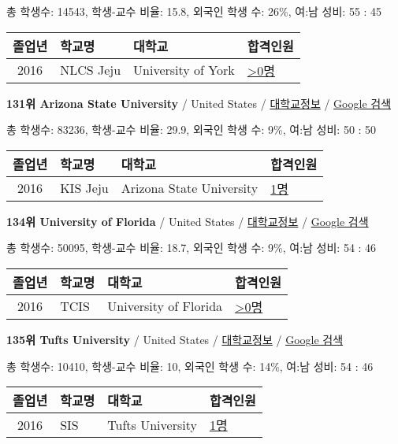 \documentclass[13pt,]{article}
\begin{document}
총 학생수: 14543, 학생-교수 비율: 15.8, 외국인 학생 수: 26\%, 여:남
성비: 55 : 45

\begin{longtable}[]{@{}clll@{}}
\toprule
졸업년 & 학교명 & 대학교 & 합격인원\tabularnewline
\midrule
\endhead
2016 & NLCS Jeju & University of York &
\href{http://cafe.naver.com/assarabia/11592}{\textgreater{}0명}\tabularnewline
\bottomrule
\end{longtable}

\textbf{131위 Arizona State University} / United States /
\href{https://www.timeshighereducation.com/world-university-rankings/arizona-state-university?ranking-dataset=589595}{대학교정보}
/ \href{http://www.google.com/search?q=Arizona+State+University}{Google
검색}

총 학생수: 83236, 학생-교수 비율: 29.9, 외국인 학생 수: 9\%, 여:남 성비:
50 : 50

\begin{longtable}[]{@{}clll@{}}
\toprule
졸업년 & 학교명 & 대학교 & 합격인원\tabularnewline
\midrule
\endhead
2016 & KIS Jeju & Arizona State University &
\href{http://cafe.naver.com/assarabia/11596}{1명}\tabularnewline
\bottomrule
\end{longtable}

\textbf{134위 University of Florida} / United States /
\href{https://www.timeshighereducation.com/world-university-rankings/university-of-florida?ranking-dataset=589595}{대학교정보}
/ \href{http://www.google.com/search?q=University+of+Florida}{Google
검색}

총 학생수: 50095, 학생-교수 비율: 18.7, 외국인 학생 수: 9\%, 여:남 성비:
54 : 46

\begin{longtable}[]{@{}clll@{}}
\toprule
졸업년 & 학교명 & 대학교 & 합격인원\tabularnewline
\midrule
\endhead
2016 & TCIS & University of Florida &
\href{http://cafe.naver.com/assarabia/11598}{\textgreater{}0명}\tabularnewline
\bottomrule
\end{longtable}

\textbf{135위 Tufts University} / United States /
\href{https://www.timeshighereducation.com/world-university-rankings/tufts-university?ranking-dataset=589595}{대학교정보}
/ \href{http://www.google.com/search?q=Tufts+University}{Google 검색}

총 학생수: 10410, 학생-교수 비율: 10, 외국인 학생 수: 14\%, 여:남 성비:
54 : 46

\begin{longtable}[]{@{}clll@{}}
\toprule
졸업년 & 학교명 & 대학교 & 합격인원\tabularnewline
\midrule
\endhead
2016 & SIS & Tufts University &
\href{http://cafe.naver.com/assarabia/11589}{1명}\tabularnewline
\bottomrule
\end{longtable}
\end{document}
